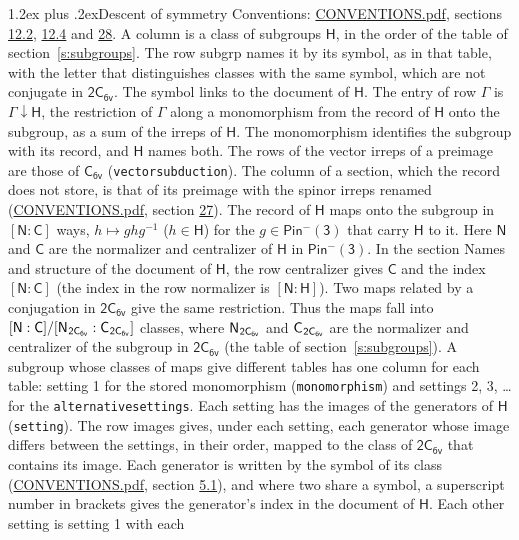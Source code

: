 \documentclass[10pt,a4paper]{article}
\makeatletter
\renewcommand\section{\@startsection{section}{1}{\z@}{-3ex plus -1ex minus -.2ex}%
  {1.2ex plus .2ex}{\normalfont\large\sffamily\bfseries\color{parttitle}}}
\numberwithin{equation}{section}
\newcommand{\grp}[1]{\mathsf{#1}}
\newcommand{\grpindex}[2]{[#1 : #2]}
\newcommand{\restr}[2]{#1\!\downarrow#2}
\newcommand{\hairsp}{\mkern1mu}
\makeatother
\begin{document}
\section{Descent of symmetry}\label{s:subduction}
Conventions: \href{../../CONVENTIONS.pdf}{CONVENTIONS.pdf}, sections \href{../../../rotation/CONVENTIONS.pdf\#conv.12.2}{12.2}, \href{../../../rotation/CONVENTIONS.pdf\#conv.12.4}{12.4} and \href{../../CONVENTIONS.pdf\#conv.28}{28}.
A column is a class of subgroups $\grp{H}$, in the order of the table of section~\ref{s:subgroups}. The row subgrp names it by its symbol, as in that table, with the letter that distinguishes classes with the same symbol, which are not conjugate in $\grp{2C_{6v}}$. The symbol links to the document of $\grp{H}$. The entry of row $\Gamma$ is $\restr{\Gamma}{\grp{H}}$, the restriction of $\Gamma$ along a monomorphism from the record of $\grp{H}$ onto the subgroup, as a sum of the irreps of $\grp{H}$. The monomorphism identifies the subgroup with its record, and $\grp{H}$ names both. The rows of the vector irreps of a preimage are those of \href{../../../rotation/data/pdf/C6v.pdf}{$\grp{C_{6v}}$} (\texttt{vectorsubduction}). The column of a section, which the record does not store, is that of its preimage with the spinor irreps renamed (\href{../../CONVENTIONS.pdf}{CONVENTIONS.pdf}, section \href{../../CONVENTIONS.pdf\#conv.27}{27}). \label{n:group.normalizer.o3}\label{n:group.centralizer.o3}\label{n:element.h}The record of $\grp{H}$ maps onto the subgroup in $\grpindex{\grp{N}}{\grp{C}}$ ways, $h \mapsto g h g^{-1}$ ($h \in \grp{H}$) for the $g \in \grp{Pin^{-}(3)}$ that carry $\grp{H}$ to it. Here $\grp{N}$ and $\grp{C}$ are the normalizer and centralizer of $\grp{H}$ in \href{Pinminus3.pdf}{$\grp{Pin^{-}(3)}$}. In the section Names and structure of the document of $\grp{H}$, the row centralizer gives $\grp{C}$ and the index $\grpindex{\grp{N}}{\grp{C}}$ (the index in the row normalizer is $\grpindex{\grp{N}}{\grp{H}}$). Two maps related by a conjugation in $\grp{2C_{6v}}$ give the same restriction. Thus the maps fall into $\grpindex{\grp{N}}{\grp{C}}/\grpindex{\grp{N}_{\hairsp \grp{2C_{6v}}}}{\grp{C}_{\hairsp \grp{2C_{6v}}}}$ classes, where $\grp{N}_{\hairsp \grp{2C_{6v}}}$ and $\grp{C}_{\hairsp \grp{2C_{6v}}}$ are the normalizer and centralizer of the subgroup in $\grp{2C_{6v}}$ (the table of section~\ref{s:subgroups}). \label{n:head.setting}A subgroup whose classes of maps give different tables has one column for each table: setting 1 for the stored monomorphism (\texttt{monomorphism}) and settings 2, 3, \dots{} for the \texttt{alternativesettings}. Each setting has the images of the generators of $\grp{H}$ (\texttt{setting}). \label{n:head.images}The row images gives, under each setting, each generator whose image differs between the settings, in their order, mapped to the class of $\grp{2C_{6v}}$ that contains its image. Each generator is written by the symbol of its class (\href{../../CONVENTIONS.pdf}{CONVENTIONS.pdf}, section \href{../../../rotation/CONVENTIONS.pdf\#conv.5.1}{5.1}), and where two share a symbol, a superscript number in brackets gives the generator's index in the document of $\grp{H}$. \label{n:irrep.Delta}Each other setting is setting 1 with each 
\end{document}
